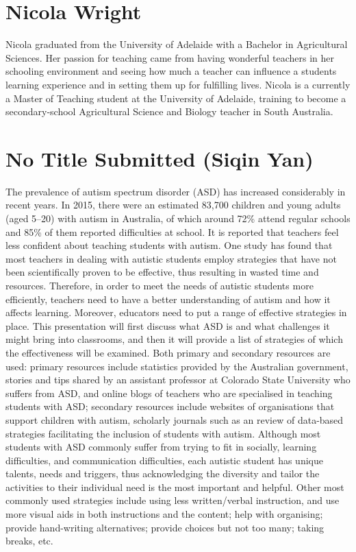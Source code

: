 \documentclass[twoside,12pt,a4paper,notitlepage]{memoir}
\begin{document}
\section*{Nicola Wright}

Nicola graduated from the University of Adelaide with a Bachelor in Agricultural Sciences. Her passion for teaching came from having wonderful teachers in her schooling environment and seeing how much a teacher can influence a students learning experience and in setting them up for fulfilling lives. Nicola is a currently a Master of Teaching student at the University of Adelaide, training to become a secondary-school Agricultural Science and Biology teacher in South Australia.



\pagebreak
\section*{No Title Submitted (Siqin Yan)}
\label{aut:yan}

The prevalence of autism spectrum disorder (ASD) has increased considerably in recent years. In 2015, there were an estimated 83,700 children and young adults (aged 5–20) with autism in Australia, of which around 72\% attend regular schools and 85\% of them reported difficulties at school. It is reported that teachers feel less confident about teaching students with autism. One study has found that most teachers in dealing with autistic students employ strategies that have not been scientifically proven to be effective, thus resulting in wasted time and resources. Therefore, in order to meet the needs of autistic students more efficiently, teachers need to have a better understanding of autism and how it affects learning. Moreover, educators need to put a range of effective strategies in place. This presentation will first discuss what ASD is and what challenges it might bring into classrooms, and then it will provide a list of strategies of which the effectiveness will be examined. Both primary and secondary resources are used: primary resources include statistics provided by the Australian government, stories and tips shared by an assistant professor at Colorado State University who suffers from ASD, and online blogs of teachers who are specialised in teaching students with ASD; secondary resources include websites of organisations that support children with autism, scholarly journals such as an review of data-based strategies facilitating the inclusion of students with autism. Although most students with ASD commonly suffer from trying to fit in socially, learning difficulties, and communication difficulties, each autistic student has unique talents, needs and triggers, thus acknowledging the diversity and tailor the activities to their individual need is the most important and helpful. Other most commonly used strategies include using less written/verbal instruction, and use more visual aids in both instructions and the content; help with organising; provide hand-writing alternatives; provide choices but not too many; taking breaks, etc. 
\end{document}
